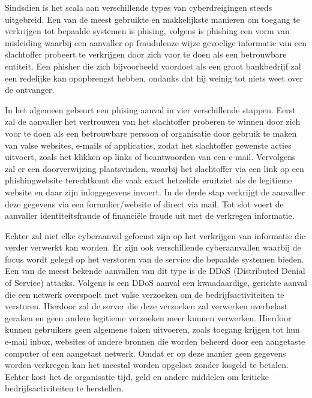 Sindsdien is het scala aan verschillende types van cyberdreigingen steeds uitgebreid. Een van de meest gebruikte en makkelijkste manieren om toegang te verkrijgen tot bepaalde systemen is phising, volgens \textcite{jagatic2007} is phishing een vorm van misleiding waarbij een aanvaller op frauduleuze wijze gevoelige informatie van een slachtoffer probeert te verkrijgen door zich voor te doen als een betrouwbare entiteit. Een phisher die zich bijvoorbeeld voordoet als een groot bankbedrijf zal een redelijke kan opopbrengst hebben, ondanks dat hij weinig tot niets weet over de ontvanger. 

In het algemeen gebeurt een phising aanval in vier verschillende stappen. Eerst zal de aanvaller het vertrouwen van het slachtoffer proberen te winnen door zich voor te doen als een betrouwbare persoon of organisatie door gebruik te maken van valse websites, e-mails of applicaties, zodat het slachtoffer gewenste acties uitvoert, zoals het klikken op links of beantwoorden van een e-mail. Vervolgens zal er een doorverwijzing plaatsvinden, waarbij het slachtoffer via een link op een phishingwebsite terechtkomt die vaak exact hetzelfde eruitziet als de legitieme website en daar zijn inloggegevens invoert. In de derde stap verkrijgt de aanvaller deze gegevens via een formulier/website of direct via mail. Tot slot voert de aanvaller identiteitsfraude of financiële fraude uit met de verkregen informatie. \autocite{varshney2024}

Echter zal niet elke cyberaanval gefocust zijn op het verkrijgen van informatie die verder verwerkt kan worden. Er zijn ook verschillende cyberaanvallen waarbij de focus wordt gelegd op het verstoren van de service die bepaalde systemen bieden. Een van de meest bekende aanvallen van dit type is de DDoS (Distributed Denial of Service) attacks. Volgens \textcite{Baker2024} is een DDoS aanval een kwaadaardige, gerichte aanval die een netwerk overspoelt met valse verzoeken om de bedrijfsactiviteiten te verstoren. Hierdoor zal de server die deze verzoeken zal verwerken overbelast geraken en geen andere legitieme verzoeken meer kunnen verwerken. Hierdoor kunnen gebruikers geen algemene taken uitvoeren, zoals toegang krijgen tot hun e-mail inbox, websites of andere bronnen die worden beheerd door een aangetaste computer of een aangetast netwerk. Omdat er op deze manier geen gegevens worden verkregen kan het meestal worden opgelost zonder losgeld te betalen. Echter kost het de organisatie tijd, geld en andere middelen om kritieke bedrijfsactiviteiten te herstellen.

